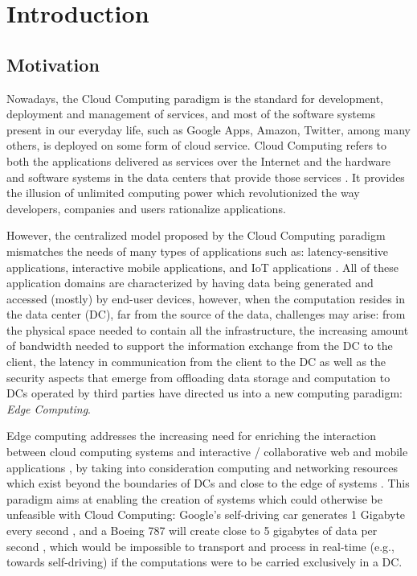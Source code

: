 \newcommand{\novathesis}{\emph{novathesis}}
\newcommand{\novathesisclass}{\texttt{novathesis.cls}}

\chapter{Introduction}
\label{cha:introduction}

\section{Motivation}

Nowadays, the Cloud Computing paradigm is the standard for development, deployment and management of services, and most of the software systems present in our everyday life, such as Google Apps, Amazon, Twitter, among many others, is deployed on some form of cloud service. Cloud Computing refers to both the applications delivered as services over the Internet and the hardware and software systems in the data centers that provide those services \cite{10.1145/1721654.1721672}. It provides the illusion of unlimited computing power which revolutionized the way developers, companies and users rationalize applications.

However, the centralized model proposed by the Cloud Computing paradigm mismatches the needs of many types of applications  such as: latency-sensitive applications, interactive mobile applications, and IoT applications \cite{10.1145/3154815}. All of these application domains are characterized by having data being generated and accessed (mostly) by end-user devices, however, when the computation resides in the data center (DC), far from the source of the data, challenges may arise: from the physical space needed to contain all the infrastructure, the increasing amount of bandwidth needed to support the information exchange from the DC to the client, the latency in communication from the client to the DC as well as the security aspects that emerge from offloading data storage and computation to DCs operated by third parties have directed us into a new computing paradigm: \textit{Edge Computing}.

Edge computing addresses the increasing need for enriching the interaction between cloud computing systems and interactive / collaborative web and mobile applications \cite{10.1145/242857.242867}, by taking into consideration  computing and networking resources which exist beyond the boundaries of DCs and close to the edge of systems \cite{Leitao2018} \cite{7488250}. This paradigm aims at enabling the creation of systems which could otherwise be unfeasible with Cloud Computing: Google's self-driving car generates 1 Gigabyte every second \cite{datafloq}, and a Boeing 787 will create close to 5 gigabytes of data per second \cite{finnegan_2013}, which would be impossible to transport and process in real-time (e.g., towards self-driving) if the computations were to be carried exclusively in a DC. 

